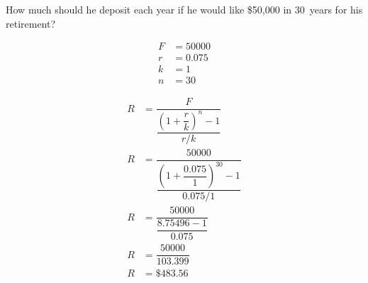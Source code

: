 \documentclass[12pt,letterpaper]{exam}
\begin{document}
\begin{questions}
\begin{parts}
        \item How much should he deposit each year if he would like \$50,000 in 30~years for his retirement? \pvspace{0.3cm}

{\itshape
\begin{minipage}[c]{0.45\textwidth}
	\[
	\begin{aligned}
	F&= 50000 \\
	r&= 0.075 \\
	k&= 1 \\
	n&= 30 
	\end{aligned}
	\]
\end{minipage}%
\begin{minipage}[b]{0.45\textwidth}
	\[
	\begin{aligned}
	R&= \dfrac{F}{\dfrac{\left( 1 + \dfrac{r}{k} \right)^n - 1}{r/k}} \\[0.3cm]
	R&= \dfrac{50000}{\dfrac{\left( 1 + \dfrac{0.075}{1} \right)^{30} - 1}{0.075/1}} \\[0.3cm]
	R&= \dfrac{50000}{\dfrac{8.75496 - 1}{0.075}} \\[0.3cm]
	R&= \dfrac{50000}{103.399} \\[0.3cm]
	R&= \$483.56
	\end{aligned}
	\]
\end{minipage}
}
        \end{parts} 


\end{questions}
\end{document}
